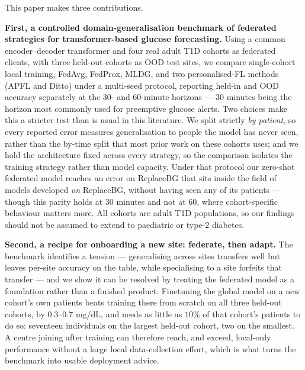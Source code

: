 \documentclass[10pt,letterpaper]{article}
\begin{document}
This paper makes three contributions.

\textbf{First, a controlled domain-generalisation benchmark of federated
strategies for transformer-based glucose forecasting.} Using a common
encoder--decoder transformer and four real adult T1D cohorts as federated
clients, with three held-out cohorts as OOD test sites, we compare single-cohort
local training, FedAvg, FedProx, MLDG, and two personalised-FL methods (APFL and
Ditto) under a multi-seed protocol, reporting held-in and OOD accuracy separately
at the 30- and 60-minute horizons --- 30 minutes being the horizon most commonly
used for preemptive glucose alerts. Two choices make this a stricter test than is
usual in this literature. We split strictly \emph{by patient}, so every reported
error measures generalisation to people the model has never seen, rather than the
by-time split that most prior work on these cohorts uses; and we hold the
architecture fixed across every strategy, so the comparison isolates the training
strategy rather than model capacity. Under that protocol our zero-shot federated
model reaches an error on ReplaceBG that sits inside the field of models developed
\emph{on} ReplaceBG, without having seen any of its patients --- though this parity
holds at 30 minutes and not at 60, where cohort-specific behaviour matters more.
All cohorts are adult T1D populations, so our findings should not be assumed to
extend to paediatric or type-2 diabetes.

\textbf{Second, a recipe for onboarding a new site: federate, then adapt.} The
benchmark identifies a tension --- generalising across sites transfers well but
leaves per-site accuracy on the table, while specialising to a site forfeits that
transfer --- and we show it can be resolved by treating the federated model as a
foundation rather than a finished product. Finetuning the global model on a new
cohort's own patients beats training there from scratch on all three held-out
cohorts, by $0.3$--$0.7$ mg/dL, and needs as little as $10\%$ of that cohort's
patients to do so: seventeen individuals on the largest held-out cohort, two on
the smallest. A centre joining after training can therefore reach, and exceed,
local-only performance without a large local data-collection effort, which is what
turns the benchmark into usable deployment advice.
\end{document}
